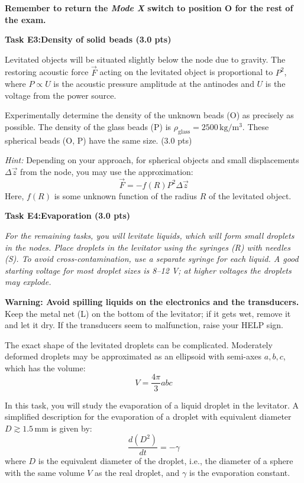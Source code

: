 \textbf{Remember to return the \textit{Mode X} switch to position O for the
rest of the exam.}

\textbf{Task E3:\quad Density of solid beads (3.0 pts)}

Levitated objects will be situated slightly below the node due to gravity. The
restoring acoustic force $\vec{F}$ acting on the levitated object is
proportional to $P^2$, where $P \propto U$ is the acoustic pressure amplitude
at the antinodes and $U$ is the voltage from the power source.

Experimentally determine the density of the unknown beads (O) as precisely as
possible. The density of the glass beads (P) is
$\rho_\mathrm{glass} = 2500\,\mathrm{kg/m^3}$. These spherical beads (O, P)
have the same size. (3.0 pts)

\textit{Hint:} Depending on your approach, for spherical objects and small
displacements $\Delta\vec{z}$ from the node, you may use the approximation:
\begin{equation}
\vec{F} = -f(R)P^2\Delta\vec{z} \tag{1}
\end{equation}
Here, $f(R)$ is some unknown function of the radius $R$ of the levitated
object.

\textbf{Task E4:\quad Evaporation (3.0 pts)}

\textit{For the remaining tasks, you will levitate liquids, which will form
small droplets in the nodes. Place droplets in the levitator using the
syringes (R) with needles (S). To avoid cross-contamination, use a separate
syringe for each liquid. A good starting voltage for most droplet sizes is
8–12 V; at higher voltages the droplets may explode.}

\textbf{Warning: Avoid spilling liquids on the electronics and the
transducers.} Keep the metal net (L) on the bottom of the levitator; if it gets
wet, remove it and let it dry. If the transducers seem to malfunction, raise
your HELP sign.

The exact shape of the levitated droplets can be complicated. Moderately
deformed droplets may be approximated as an ellipsoid with semi-axes $a, b, c$,
which has the volume:
\begin{equation}
V = \frac{4\pi}{3}abc \tag{2}
\end{equation}

In this task, you will study the evaporation of a liquid droplet in the
levitator. A simplified description for the evaporation of a droplet with
equivalent diameter $D \gtrsim 1.5\,\mathrm{mm}$ is given by:
\begin{equation}
\frac{d(D^2)}{dt} = -\gamma \tag{3}
\end{equation}
where $D$ is the equivalent diameter of the droplet, i.e., the diameter of a
sphere with the same volume $V$ as the real droplet, and $\gamma$ is the
evaporation constant.

